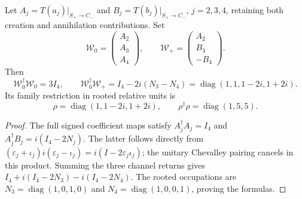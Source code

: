 \documentclass[11pt]{article}
\begin{document}
\begin{proposition}
\label{p1:prop:v242-complete-transverse-return}
Let \(A_j=T(a_j)|_{S_+\to C_-}\) and
\(B_j=T(b_j)|_{S_+\to C_-}\), \(j=2,3,4\), retaining both
creation and annihilation contributions. Set
\[
 \mathcal W_0=\begin{pmatrix}A_2\\A_3\\A_4\end{pmatrix},\qquad
 \mathcal W_+=\begin{pmatrix}A_2\\B_3\\-B_4\end{pmatrix}.
\]
Then
\[
 \boxed{\mathcal W_0^\dagger\mathcal W_0=3I_4,\qquad
 \mathcal W_0^\dagger\mathcal W_+
  =I_4-2i(N_3-N_4)
  =\operatorname{diag}(1,1,1-2i,1+2i).}
\]
Its family restriction in rooted relative units is
\[
 \boxed{\rho=\operatorname{diag}(1,1-2i,1+2i),\qquad
        \rho^\dagger\rho=\operatorname{diag}(1,5,5).}
\]
\end{proposition}
\begin{proof}
The full signed coefficient maps satisfy
\(A_j^\dagger A_j=I_4\) and
\(A_j^\dagger B_j=i(I_4-2N_j)\). The latter follows directly from
\((\varepsilon_j+\iota_j)i(\varepsilon_j-\iota_j)
=i(I-2\varepsilon_j\iota_j)\); the unitary Chevalley pairing cancels
in this product. Summing the three channel returns gives
\(I_4+i(I_4-2N_3)-i(I_4-2N_4)\).
The rooted occupations are
\(N_3=\operatorname{diag}(1,0,1,0)\) and
\(N_4=\operatorname{diag}(1,0,0,1)\), proving the formulas.
\end{proof}
\end{document}

